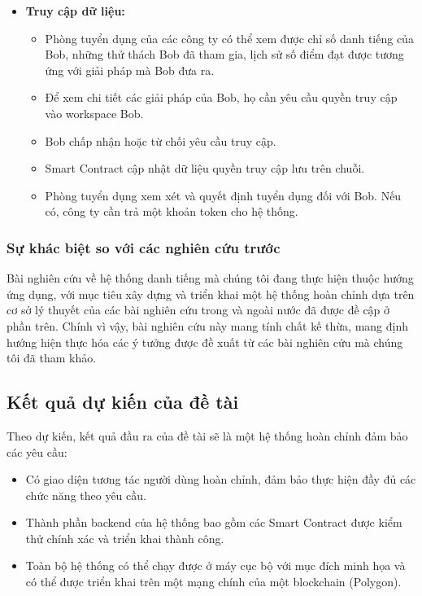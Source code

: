 \documentclass{article}[14pt]
\begin{document}
{\begin{enumerate}[label=\textbf{\alph*.}]
\begin{itemize}
                    \item \textbf{Truy cập dữ liệu:}
                    \begin{itemize} 
                        \item Phòng tuyển dụng của các công ty có thể xem được chỉ số danh tiếng của Bob, những thử thách Bob đã tham gia, lịch sử số điểm đạt được tương ứng với giải pháp mà Bob đưa ra.
                        \item Để xem chi tiết các giải pháp của Bob, họ cần yêu cầu quyền truy cập vào workspace Bob.
                        \item Bob chấp nhận hoặc từ chối yêu cầu truy cập. 
                        \item Smart Contract cập nhật dữ liệu quyền truy cập lưu trên chuỗi. 
                        \item Phòng tuyển dụng xem xét và quyết định tuyển dụng đối với Bob. Nếu có, công ty cần trả một khoản token cho hệ thống. 
                    \end{itemize}
                \end{itemize}
            \end{enumerate}

        \subsubsection{Sự khác biệt so với các nghiên cứu trước}
            Bài nghiên cứu về hệ thống danh tiếng mà chúng tôi đang thực hiện thuộc hướng ứng dụng, với mục tiêu xây dựng và triển khai một hệ thống hoàn chỉnh dựa trên cơ sở lý thuyết của các bài nghiên cứu trong và ngoài nước đã được đề cập ở phần trên. Chính vì vậy, bài nghiên cứu này mang tính chất kế thừa, mang định hướng hiện thực hóa các ý tưởng được đề xuất từ các bài nghiên cứu mà chúng tôi đã tham khảo. 
    
    \subsection{Kết quả dự kiến của đề tài}
        Theo dự kiến, kết quả đầu ra của đề tài sẽ là một hệ thống hoàn chỉnh đảm bảo các yêu cầu: 
        \begin{itemize}
            \item Có giao diện tương tác người dùng hoàn chỉnh, đảm bảo thực hiện đầy đủ các chức năng theo yêu cầu. 
            \item Thành phần backend của hệ thống bao gồm các Smart Contract được kiểm thử chính xác và triển khai thành công. 
            \item Toàn bộ hệ thống có thể chạy được ở máy cục bộ với mục đích minh họa và có thể được triển khai trên một mạng chính của một blockchain (Polygon). 
        \end{itemize}
    
}
\end{document}
